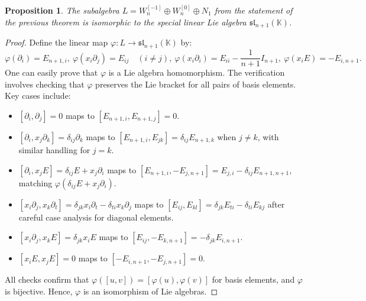 \documentclass[12pt,a4paper]{amsart}
\theoremstyle{plain}
\newtheorem{proposition}{Proposition}
\theoremstyle{definition}
\begin{document}
{	\begin{proposition}
		The subalgebra $L = W_n^{[-1]} \oplus W_n^{[0]} \oplus N_1$ from the statement of the previous theorem
		is isomorphic to the special linear Lie algebra $\mathfrak{sl}_{n+1}(\mathbb K)$.
	\end{proposition}
	\begin{proof}
		Define the linear map $\varphi \colon L \to \mathfrak{sl}_{n+1}(\mathbb K)$ by:
		$$		\varphi(\partial_{i})= E_{n+1,i}, \ 
		\varphi(x_{i}\partial_{j})= E_{ij} \quad (i \neq j), \ 
		\varphi(x_{i}\partial_{i})= E_{ii} - \frac{1}{n+1} I_{n+1}, \
		\varphi(x_{i}E)= -E_{i,n+1}.
		$$	
		One can  easily prove that  $\varphi$ is a Lie algebra homomorphism. The verification involves checking that $\varphi$ preserves the Lie bracket for all pairs of basis elements. Key cases include:
		\begin{itemize}
			\item $[\partial_{i},\partial_{j}]=0$ maps to $[E_{n+1,i},E_{n+1,j}]=0$.
			\item $[\partial_{i},x_{j}\partial_{k}]=\delta_{ij}\partial_{k}$ maps to $[E_{n+1,i},E_{jk}]=\delta_{ij}E_{n+1,k}$ when $j\neq k$, with similar handling for $j=k$.
			\item $[\partial_{i},x_{j}E]=\delta_{ij}E+x_{j}\partial_{i}$ maps to $[E_{n+1,i},-E_{j,n+1}]=E_{j,i}-\delta_{ij}E_{n+1,n+1}$, matching $\varphi(\delta_{ij}E+x_{j}\partial_{i})$.
			\item $[x_{i}\partial_{j},x_{k}\partial_{t}]=\delta_{jk}x_{i}\partial_{t}-\delta_{ti}x_{k}\partial_{j}$ maps to $[E_{ij},E_{kl}]=\delta_{jk}E_{ti}-\delta_{ti}E_{kj}$ after careful case analysis for diagonal elements.
			\item $[x_{i}\partial_{j},x_{k}E]=\delta_{jk}x_{i}E$ maps to $[E_{ij},-E_{k,n+1}]=-\delta_{jk}E_{i,n+1}$.
			\item $[x_{i}E,x_{j}E]=0$ maps to $[-E_{i,n+1},-E_{j,n+1}]=0$.
		\end{itemize}
		All checks confirm that $\varphi([u,v])=[\varphi(u),\varphi(v)]$ for basis elements, and $\varphi$ is bijective. Hence, $\varphi$ is an isomorphism of Lie algebras.
	\end{proof}
	
}
\end{document}

